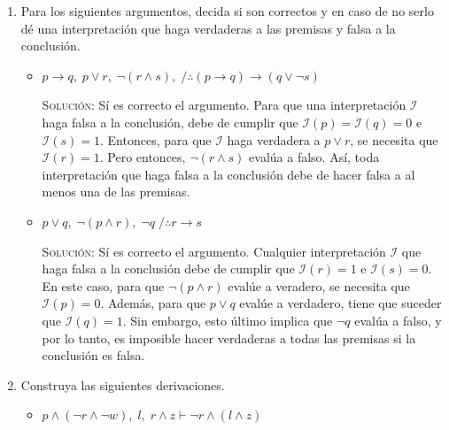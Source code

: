 \documentclass[letterpaper,11pt]{article}
\begin{document}
\begin{enumerate}
    \item Para los siguientes argumentos, decida si son correctos y en caso de 
    no serlo dé una interpretación que haga verdaderas a las premisas y falsa 
    a la conclusión.

    \begin{itemize}
        \item $p → q, \; p \lor r, \; \neg (r \land s), \; /∴ (p → q) → 
               (q \lor \neg s)$

        \textsc{Solución:} Sí es correcto el argumento. Para que una 
        interpretación $\mathcal{I}$ haga falsa a la conclusión, debe de 
        cumplir que $\mathcal{I}(p) = \mathcal{I}(q) = 0$ e $\mathcal{I}(s) = 1$.
        Entonces, para que $\mathcal{I}$ haga verdadera a $p \lor r$, se necesita
        que $\mathcal{I}(r) = 1$. Pero entonces, $\neg (r \land s)$ evalúa a 
        falso. Así, toda interpretación que haga falsa a la conclusión debe de  
        hacer falsa a al menos una de las premisas. 

        \item $p \lor q, \; \neg (p \land r), \; \neg q \; /∴ r → s$
        
        \textsc{Solución:} Sí es correcto el argumento. Cualquier interpretación
        $\mathcal{I}$ que haga falsa a la conclusión debe de cumplir que 
        $\mathcal{I}(r) = 1$ e $\mathcal{I}(s) = 0$. En este caso, para que 
        $\neg (p \land r)$ evalúe a veradero, se necesita que $\mathcal{I}(p) = 0$.
        Además, para que $p \lor q$ evalúe a verdadero, tiene que suceder que 
        $\mathcal{I}(q) = 1$. Sin embargo, esto último implica que $\neg q$ 
        evalúa a falso, y por lo tanto, es imposible hacer verdaderas a todas las 
        premisas si la conclusión es falsa.
    \end{itemize}

    \newpage
    \item Construya las siguientes derivaciones.

    \begin{itemize}
        \item $p \land (\neg r \land \neg w), \; l, \; r \land z ⊢ \neg r 
               \land (l \land z)$
        

\end{itemize}
\end{enumerate}
\end{document}
